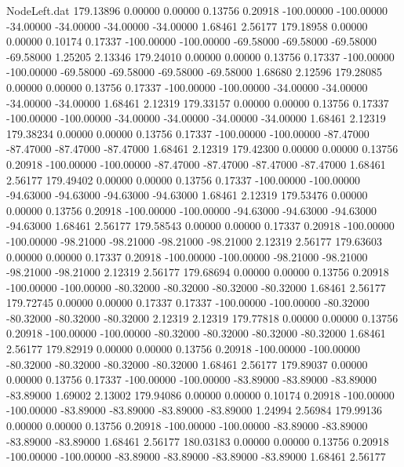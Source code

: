 \begin{filecontents}{NodeLeft.dat}
 179.13896    0.00000    0.00000     0.13756    0.20918 -100.00000 -100.00000  -34.00000  -34.00000  -34.00000  -34.00000    1.68461    2.56177
 179.18958    0.00000    0.00000     0.10174    0.17337 -100.00000 -100.00000  -69.58000  -69.58000  -69.58000  -69.58000    1.25205    2.13346
 179.24010    0.00000    0.00000     0.13756    0.17337 -100.00000 -100.00000  -69.58000  -69.58000  -69.58000  -69.58000    1.68680    2.12596
 179.28085    0.00000    0.00000     0.13756    0.17337 -100.00000 -100.00000  -34.00000  -34.00000  -34.00000  -34.00000    1.68461    2.12319
 179.33157    0.00000    0.00000     0.13756    0.17337 -100.00000 -100.00000  -34.00000  -34.00000  -34.00000  -34.00000    1.68461    2.12319
 179.38234    0.00000    0.00000     0.13756    0.17337 -100.00000 -100.00000  -87.47000  -87.47000  -87.47000  -87.47000    1.68461    2.12319
 179.42300    0.00000    0.00000     0.13756    0.20918 -100.00000 -100.00000  -87.47000  -87.47000  -87.47000  -87.47000    1.68461    2.56177
 179.49402    0.00000    0.00000     0.13756    0.17337 -100.00000 -100.00000  -94.63000  -94.63000  -94.63000  -94.63000    1.68461    2.12319
 179.53476    0.00000    0.00000     0.13756    0.20918 -100.00000 -100.00000  -94.63000  -94.63000  -94.63000  -94.63000    1.68461    2.56177
 179.58543    0.00000    0.00000     0.17337    0.20918 -100.00000 -100.00000  -98.21000  -98.21000  -98.21000  -98.21000    2.12319    2.56177
 179.63603    0.00000    0.00000     0.17337    0.20918 -100.00000 -100.00000  -98.21000  -98.21000  -98.21000  -98.21000    2.12319    2.56177
 179.68694    0.00000    0.00000     0.13756    0.20918 -100.00000 -100.00000  -80.32000  -80.32000  -80.32000  -80.32000    1.68461    2.56177
 179.72745    0.00000    0.00000     0.17337    0.17337 -100.00000 -100.00000  -80.32000  -80.32000  -80.32000  -80.32000    2.12319    2.12319
 179.77818    0.00000    0.00000     0.13756    0.20918 -100.00000 -100.00000  -80.32000  -80.32000  -80.32000  -80.32000    1.68461    2.56177
 179.82919    0.00000    0.00000     0.13756    0.20918 -100.00000 -100.00000  -80.32000  -80.32000  -80.32000  -80.32000    1.68461    2.56177
 179.89037    0.00000    0.00000     0.13756    0.17337 -100.00000 -100.00000  -83.89000  -83.89000  -83.89000  -83.89000    1.69002    2.13002
 179.94086    0.00000    0.00000     0.10174    0.20918 -100.00000 -100.00000  -83.89000  -83.89000  -83.89000  -83.89000    1.24994    2.56984
 179.99136    0.00000    0.00000     0.13756    0.20918 -100.00000 -100.00000  -83.89000  -83.89000  -83.89000  -83.89000    1.68461    2.56177
 180.03183    0.00000    0.00000     0.13756    0.20918 -100.00000 -100.00000  -83.89000  -83.89000  -83.89000  -83.89000    1.68461    2.56177

\end{filecontents}
